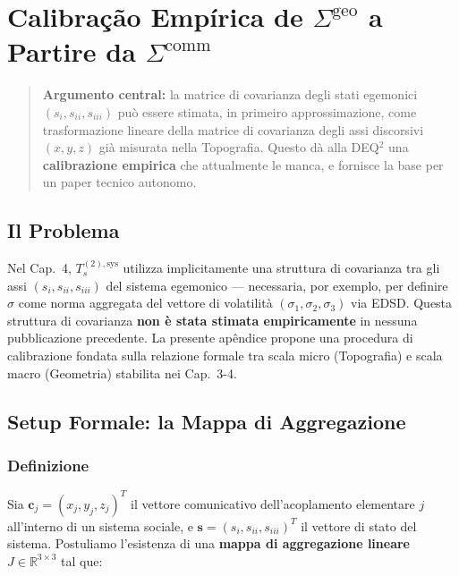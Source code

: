 \chapter{\texorpdfstring{Calibração Empírica de
\(\Sigma^{\text{geo}}\) a Partire da
\(\Sigma^{\text{comm}}\)}{Calibração Empírica de \textbackslash Sigma\^{}\{\textbackslash text\{geo\}\} a Partire da \textbackslash Sigma\^{}\{\textbackslash text\{comm\}\}}}\label{calibrazione-empirica-di-sigmatextgeo-a-partire-da-sigmatextcomm}

\begin{quote}
\textbf{Argumento central:} la matrice di covarianza degli stati
egemonici \((s_i, s_{ii}, s_{iii})\) può essere stimata, in primeiro
approssimazione, come trasformazione lineare della matrice di covarianza
degli assi discorsivi \((x, y, z)\) già misurata nella Topografia.
Questo dà alla DEQ$^2$ una \textbf{calibrazione empirica} che attualmente
le manca, e fornisce la base per un paper tecnico autonomo.
\end{quote}



\section{Il Problema}\label{il-problema}

Nel Cap.~4, \(T_s^{(2),\text{sys}}\) utilizza implicitamente una
struttura di covarianza tra gli assi \((s_i, s_{ii}, s_{iii})\) del
sistema egemonico --- necessaria, por exemplo, per definire \(\sigma\)
come norma aggregata del vettore di volatilità
\((\sigma_1, \sigma_2, \sigma_3)\) via EDSD. Questa struttura di
covarianza \textbf{non è stata stimata empiricamente} in nessuna
pubblicazione precedente. La presente apêndice propone una procedura di
calibrazione fondata sulla relazione formale tra scala micro
(Topografia) e scala macro (Geometria) stabilita nei Cap.~3-4.



\section{Setup Formale: la Mappa di
Aggregazione}\label{setup-formale-la-mappa-di-aggregazione}

\subsection{Definizione}\label{definição}

Sia \(\mathbf{c}_j = (x_j, y_j, z_j)^T\) il vettore comunicativo
dell'acoplamento elementare \(j\) all'interno di un sistema sociale, e
\(\mathbf{s} = (s_i, s_{ii}, s_{iii})^T\) il vettore di stato del
sistema. Postuliamo l'esistenza di una \textbf{mappa di aggregazione
lineare} \(J \in \mathbb{R}^{3 \times 3}\) tal que:

